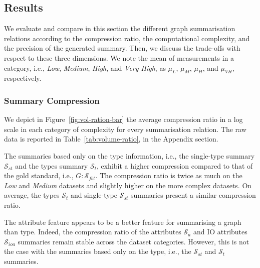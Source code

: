 

\subsection{Results}
\label{sec:eval:results}

We evaluate and compare in this section the different graph summarisation relations according to the compression ratio, the computational complexity, and the precision of the generated summary. Then, we discuss the trade-offs with respect to these three dimensions.
We note the mean of measurements in a category, i.e., \emph{Low}, \emph{Medium}, \emph{High}, and \emph{Very High}, as $\mu_{L}$, $\mu_{M}$, $\mu_{H}$, and $\mu_{VH}$, respectively.

\subsubsection{Summary Compression}

We depict in Figure~\ref{fig:vol-ration-bar} the average compression ratio in a log scale in each category of complexity for every summarisation relation. The raw data is reported in Table~\ref{tab:volume-ratio}, in the Appendix section.

The summaries based only on the type information, i.e., the single-type summary $\mathcal{S}_{st}$ and the types summary $\mathcal{S}_t$, exhibit a higher compression compared to that of the gold standard, i.e., $G:\mathcal{S}_{fbt}$. The compression ratio is twice as much on the \emph{Low} and \emph{Medium} datasets and slightly higher on the more complex datasets. On average, the types $\mathcal{S}_t$ and  single-type $\mathcal{S}_{st}$ summaries present a similar compression ratio.

The attribute feature appears to be a better feature for summarising a graph than type. Indeed, the compression ratio of the attributes  $\mathcal{S}_a$ and IO attributes $\mathcal{S}_{ioa}$ summaries remain stable across the dataset categories. However, this is not the case with the summaries based only on the type, i.e., the $\mathcal{S}_{st}$ and $\mathcal{S}_t$ summaries.

